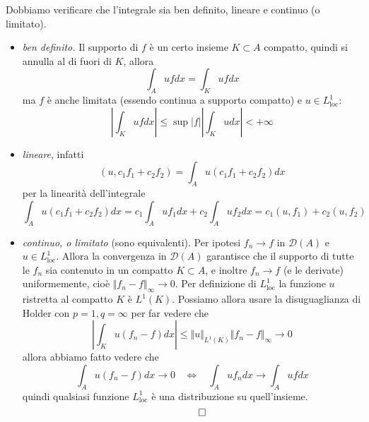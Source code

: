 \documentclass[10pt,a4paper,twoside]{book}
\begin{document}
Dobbiamo verificare che l'integrale sia ben definito, lineare e continuo (o limitato).
\begin{itemize}
\item \textit{ben definito.} Il supporto di $f$ è un certo insieme $K\subset A$ compatto, quindi si annulla al di fuori di $K$, allora\begin{equation*}
\int _{A} ufdx=\int _{K} ufdx
\end{equation*}ma $f$ è anche limitata (essendo continua a supporto compatto) e $u\in L^{1}_{\mathrm{loc}}$:\begin{equation*}
\left| \int _{K} ufdx\right| \leqslant \sup | f| \left| \int _{K} udx\right| < +\infty 
\end{equation*}
\item \textit{lineare}, infatti\begin{equation*}
( u,c_{1} f_{1} +c_{2} f_{2}) =\int _{A} u( c_{1} f_{1} +c_{2} f_{2}) dx
\end{equation*}per la linearità dell'integrale\begin{equation*}
\int _{A} u( c_{1} f_{1} +c_{2} f_{2}) dx=c_{1}\int _{A} uf_{1} dx+c_{2}\int _{A} uf_{2} dx=c_{1}( u,f_{1}) +c_{2}( u,f_{2})
\end{equation*}
\item \textit{continuo, o limitato} (sono equivalenti). Per ipotesi $f_{n}\rightarrow f$ in $\mathcal{D}( A)$ e $u\in L^{1}_{\mathrm{loc}}$. Allora la convergenza in $\mathcal{D}( A)$ garantisce che il supporto di tutte le $f_{n}$ sia contenuto in un compatto $K\subset A$, e inoltre $f_{n}\rightarrow f$ (e le derivate) uniformemente, cioè $\Vert f_{n} -f\Vert _{\infty }\rightarrow 0$. Per definizione di $L^{1}_{\mathrm{loc}}$ la funzione $u$ ristretta al compatto $K$ è $L^{1}( K)$. Possiamo allora usare la disuguaglianza di Holder con $p=1,q=\infty $ per far vedere che\begin{equation*}
\left| \int _{K} u( f_{n} -f) dx\right| \leqslant \Vert u\Vert _{L^{1}( K)}\Vert f_{n} -f\Vert _{\infty }\rightarrow 0
\end{equation*}allora abbiamo fatto vedere che\begin{equation*}
\int _{A} u( f_{n} -f) dx\rightarrow 0\ \ \ \ \Leftrightarrow \ \ \ \ \int _{A} uf_{n} dx\rightarrow \int _{A} ufdx
\end{equation*}quindi qualsiasi funzione $L^{1}_{\mathrm{loc}}$ è una distribuzione su quell'insieme.\begin{equation*}
\qed 
\end{equation*}
\end{itemize}
\end{document}
